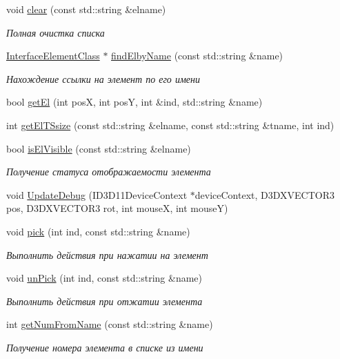 \begin{DoxyCompactItemize}
\item 
void \hyperlink{class_interface_class_a98a74604b2a361a3f06d3bd5de79d950}{clear} (const std\+::string \&elname)
\begin{DoxyCompactList}\small\item\em Полная очистка списка \end{DoxyCompactList}\item 
\hyperlink{class_interface_element_class}{Interface\+Element\+Class} $\ast$ \hyperlink{class_interface_class_a92aa486937a14f18d077823cea89a8e9}{find\+Elby\+Name} (const std\+::string \&name)
\begin{DoxyCompactList}\small\item\em Нахождение ссылки на элемент по его имени \end{DoxyCompactList}\item 
bool \hyperlink{class_interface_class_abdb92eeaa2a1dc78e200fed4b2fc2a6c}{get\+El} (int posX, int posY, int \&ind, std\+::string \&name)
\item 
int \hyperlink{class_interface_class_a810560a61cc3aa4900956cf80f192bc6}{get\+El\+T\+Ssize} (const std\+::string \&elname, const std\+::string \&tname, int ind)
\item 
bool \hyperlink{class_interface_class_a112249a32505c51d6a4c75dfe1dac7ab}{is\+El\+Visible} (const std\+::string \&elname)
\begin{DoxyCompactList}\small\item\em Получение статуса отображаемости элемента \end{DoxyCompactList}\item 
void \hyperlink{class_interface_class_af2b2c8949140d551a396cf29d9c66210}{Update\+Debug} (I\+D3\+D11\+Device\+Context $\ast$device\+Context, D3\+D\+X\+V\+E\+C\+T\+O\+R3 pos, D3\+D\+X\+V\+E\+C\+T\+O\+R3 rot, int mouseX, int mouseY)
\item 
void \hyperlink{class_interface_class_a62cd71d5b9325b648916eac7773801b8}{pick} (int ind, const std\+::string \&name)
\begin{DoxyCompactList}\small\item\em Выполнить действия при нажатии на элемент \end{DoxyCompactList}\item 
void \hyperlink{class_interface_class_a25de61bfa33421b64429844212600bcd}{un\+Pick} (int ind, const std\+::string \&name)
\begin{DoxyCompactList}\small\item\em Выполнить действия при отжатии элемента \end{DoxyCompactList}\item 
int \hyperlink{class_interface_class_ab0f724c83473028f0b3bf0442061405a}{get\+Num\+From\+Name} (const std\+::string \&name)
\begin{DoxyCompactList}\small\item\em Получение номера элемента в списке из имени \end{DoxyCompactList}\end{DoxyCompactItemize}

